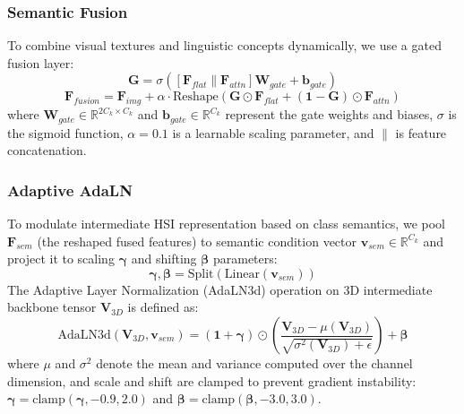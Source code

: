 \subsubsection{Semantic Fusion}
To combine visual textures and linguistic concepts dynamically, we use a gated fusion layer:
\begin{equation}
\mathbf{G} = \sigma\left(\left[\mathbf{F}_{flat} \parallel \mathbf{F}_{attn}\right] \mathbf{W}_{gate} + \mathbf{b}_{gate}\right)
\end{equation}
\begin{equation}
\mathbf{F}_{fusion} = \mathbf{F}_{img} + \alpha \cdot \text{Reshape}\left(\mathbf{G} \odot \mathbf{F}_{flat} + (\mathbf{1} - \mathbf{G}) \odot \mathbf{F}_{attn}\right)
\end{equation}
where $\mathbf{W}_{gate} \in \mathbb{R}^{2C_k \times C_k}$ and $\mathbf{b}_{gate} \in \mathbb{R}^{C_k}$ represent the gate weights and biases, $\sigma$ is the sigmoid function, $\alpha = 0.1$ is a learnable scaling parameter, and $\parallel$ is feature concatenation.

\subsubsection{Adaptive AdaLN}
To modulate intermediate HSI representation based on class semantics, we pool $\mathbf{F}_{sem}$ (the reshaped fused features) to semantic condition vector $\mathbf{v}_{sem} \in \mathbb{R}^{C_k}$ and project it to scaling $\mathbf{\gamma}$ and shifting $\mathbf{\beta}$ parameters:
\begin{equation}
\mathbf{\gamma}, \mathbf{\beta} = \text{Split}\left(\text{Linear}(\mathbf{v}_{sem})\right)
\end{equation}
The Adaptive Layer Normalization (AdaLN3d) operation on 3D intermediate backbone tensor $\mathbf{V}_{3D}$ is defined as:
\begin{equation}
\text{AdaLN3d}(\mathbf{V}_{3D}, \mathbf{v}_{sem}) = (\mathbf{1} + \mathbf{\gamma}) \odot \left(\frac{\mathbf{V}_{3D} - \mu(\mathbf{V}_{3D})}{\sqrt{\sigma^2(\mathbf{V}_{3D}) + \epsilon}}\right) + \mathbf{\beta}
\end{equation}
where $\mu$ and $\sigma^2$ denote the mean and variance computed over the channel dimension, and scale and shift are clamped to prevent gradient instability: $\mathbf{\gamma} = \text{clamp}(\mathbf{\gamma}, -0.9, 2.0)$ and $\mathbf{\beta} = \text{clamp}(\mathbf{\beta}, -3.0, 3.0)$.

